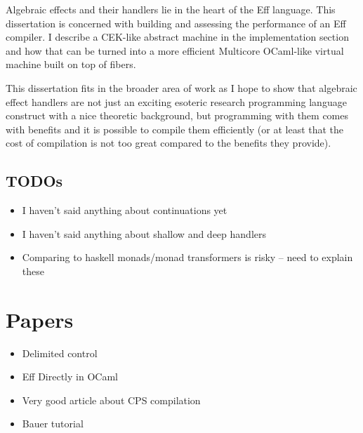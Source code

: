 \documentclass[class=article,crop=false,11pt]{standalone}
\begin{document}
Algebraic effects and their handlers lie in the heart of the Eff language.
This dissertation is concerned with building and assessing the performance of an Eff compiler.
I describe a CEK-like abstract machine in the implementation section and how that can be turned
into a more efficient Multicore OCaml-like virtual machine built on top of fibers.

This dissertation fits in the broader area of work as I hope to show that algebraic effect handlers
are not just an exciting esoteric research programming language construct with a nice theoretic background, but programming with them comes with benefits and it is possible to compile them efficiently (or at least that the cost of compilation is not too great compared to the benefits they provide).

\subsection{TODOs}
\begin{itemize}
\item I haven't said anything about continuations yet
\item I haven't said anything about shallow and deep handlers
\item Comparing to haskell monads/monad transformers is risky -- need to explain these
\end{itemize}

\section{Papers}
\begin{itemize}
\item Delimited control \cite{kiselyov2010delimited}
\item Eff Directly in OCaml \cite{Kiselyov_2018}
\item Very good article about CPS compilation \cite{flanagan1993essence}
\item Bauer tutorial \cite{bauer2018algebraic}
\end{itemize}

\ifstandalone
{}

\fi
\end{document}
